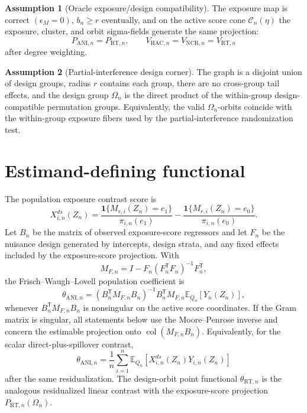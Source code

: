 \documentclass[11pt]{article}
\newcommand{\E}{\mathbb{E}}
\newcommand{\one}{\mathbf{1}}
\newcommand{\transpose}{\mathsf{T}}
\theoremstyle{definition}
\newtheorem{assumption}{Assumption}
\theoremstyle{plain}
\theoremstyle{remark}
\begin{document}
\begin{assumption}[Oracle exposure/design compatibility]\label{ass:oracle-compatibility}
The exposure map is correct \((\epsilon_M=0)\), \(b_n\ge r\) eventually, and
on the active score cone \(\mathcal C_n(\eta)\) the exposure, cluster, and
orbit sigma-fields generate the same projection:
\[
  P_{\mathrm{ANI},n}=P_{\mathrm{RT},n},
  \qquad
  V_{\mathrm{HAC},n}=V_{\mathrm{NCR},n}=V_{\mathrm{RT},n}
\]
after degree weighting.
\end{assumption}

\begin{assumption}[Partial-interference design corner]\label{ass:partial-interference-corner}
The graph is a disjoint union of design groups, radius \(r\) contains each
group, there are no cross-group tail effects, and the design group
\(\Omega_n\) is the direct product of the within-group design-compatible
permutation groups.  Equivalently, the valid \(\Omega_n\)-orbits coincide with
the within-group exposure fibers used by the partial-interference
randomization test.
\end{assumption}

\section{Estimand-defining functional}
\label{sec:estimand-functional}
The population exposure contrast score is
\[
  X_{i,n}^{ds}(Z_n)
  =
  \frac{\one\{M_{r,i}(Z_n)=e_1\}}{\pi_{i,n}(e_1)}
  -
  \frac{\one\{M_{r,i}(Z_n)=e_0\}}{\pi_{i,n}(e_0)}.
\]
Let \(B_n\) be the matrix of observed exposure-score regressors and let
\(F_n\) be the nuisance design generated by intercepts, design strata, and any
fixed effects included by the exposure-score projection.  With
\[
  M_{F,n}=I-F_n(F_n^{\transpose}F_n)^{-1}F_n^{\transpose},
\]
the Frisch--Waugh--Lovell population coefficient is
\[
  \theta_{\mathrm{ANI},n}
  =
  (B_n^{\transpose}M_{F,n}B_n)^{-1}B_n^{\transpose}M_{F,n}
  \E_{Q_n}[Y_n(Z_n)],
\]
whenever \(B_n^{\transpose}M_{F,n}B_n\) is nonsingular on the active score
coordinates.  If the Gram matrix is singular, all statements below use the
Moore--Penrose inverse and concern the estimable projection onto
\(\operatorname{col}(M_{F,n}B_n)\).  Equivalently, for the scalar
direct-plus-spillover contrast,
\[
  \theta_{\mathrm{ANI},n}
  =
  \frac1n\sum_{i=1}^n\E_{Q_n}\!\left[X_{i,n}^{ds}(Z_n)Y_{i,n}(Z_n)\right]
\]
after the same residualization.  The design-orbit point functional
\(\theta_{\mathrm{RT},n}\) is the analogous residualized linear contrast with
the exposure-score projection \(P_{\mathrm{RT},n}(\Omega_n)\).
\end{document}
